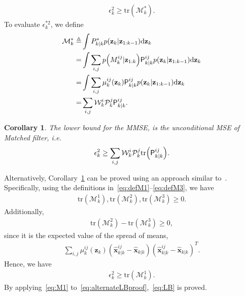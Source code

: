 \documentclass[10pt,twocolumn,twoside]{IEEEtran}
\newtheorem{corol}{Corollary}
\newcommand{\corcol}[1]{\textcolor{CorCol}{#1}}
\begin{document}
\begin{align}
\epsilon_k ^{2} \geq \mathrm{tr}{\left(\mathcal{M}^*_k\right)}.
\end{align}
To evaluate \(\epsilon_k ^{*2}\), we define
\begin{align}
\mathcal{M}^*_k \triangleq & \int P_{k|k}^*p{\left(\mathbf{{z}}_{k}|\mathbf{{z}}_{1:k-1}\right)} \mathrm{d}\mathbf{{z}}_{k} \\
= & \int \sum \limits _{i,j} p{\left(M_{k}^{ij}|\mathbf{z}_{1:k}\right)} \mathsf{P}_{k|k}^{ij}p{\left(\mathbf{{z}}_{k}|\mathbf{{z}}_{1:k-1}\right)} \mathrm{d}\mathbf{{z}}_{k} \\
= & \int \sum \limits _{i,j} \mu_{k}^{ij}{\left(\mathbf{z}_{k}\right)}\mathsf{P}_{k|k}^{ij}p{\left(\mathbf{{z}}_{k}|\mathbf{{z}}_{1:k-1}\right)} \mathrm{d}\mathbf{{z}}_{k}\\
\label{eq:LBMat} = &
 \sum \limits _{i,j} \corcol{\mathcal{W}^i_k\mathcal{P}^j_k} \mathsf{P}_{k|k}^{ij}.
\end{align}
\begin{corol}
\label{corolLB}
The lower bound for the MMSE, is the unconditional MSE of Matched filter, i.e.
\begin{align}
\label{eq:LB}
\epsilon_k ^{2} \geq \sum \limits _{i,j} \corcol{\mathcal{W}^i_k\mathcal{P}^j_k} \mathrm{tr}{\left(\mathsf{P}_{k|k}^{ij}\right)}.
\end{align}
\end{corol}
Alternatively, Corollary~\ref{corolLB} can be proved using an approach similar to~\cite{flam_mmse_2012}. Specifically, using the definitions in~\eqref{eq:defM1}--\eqref{eq:defM3}, we have
\begin{align}
\mathrm{tr}{\left(\mathcal{M}_k^1\right)}, \mathrm{tr}{\left(\mathcal{M}_k^2\right)}, \mathrm{tr}{\left(\mathcal{M}_k^3\right)} \geq 0.
\end{align}
Additionally, 
\begin{align}
\mathrm{tr}{\left(\mathcal{M}_k^2\right)}-\mathrm{tr}{\left(\mathcal{M}_k^3\right)} \geq 0,
\end{align}
since it is the expected value of the spread of means,
\begin{align} 
\sum \limits _{i,j} \mu_{k}^{ij}{\left(\mathbf{z}_{k}\right)}\left( \mathsf{\hat{\boldsymbol{x}}}_{k|k}^{ij}- \mathsf{\hat{\boldsymbol{x}}}_{k|k}\right)\left( \mathsf{\hat{\boldsymbol{x}}}_{k|k}^{ij}- \mathsf{\hat{\boldsymbol{x}}}_{k|k}\right)^T.
\end{align}
Hence, we have
\begin{align}
\label{eq:alternateLBproof}
\epsilon_k ^{2} \geq \mathrm{tr}{\left(\mathcal{M}^1_k\right)}.
\end{align}
By applying~\eqref{eq:M1} to~\eqref{eq:alternateLBproof},~\eqref{eq:LB} is proved. \ \ \ \ \ \ \ \ \ \ \ \ \ \ \ \ \ \ \ \ \ \ \ \
\IEEEQED
\end{document}
